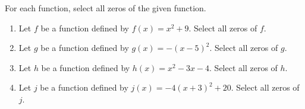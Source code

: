 \documentclass{ximera}
\author{Kenneth Berglund}
\begin{document}
\licenseSZ
\begin{exercise}
For each function, select all zeros of the given function. 

\begin{enumerate}
\item Let $f$ be a function defined by $f(x) = x^2 + 9$.
Select all zeros of $f$.
\begin{selectAll}
\end{selectAll}

\item Let $g$ be a function defined by $g(x) = -(x - 5)^2$.
Select all zeros of $g$.
\begin{selectAll}
\end{selectAll}

\item Let $h$ be a function defined by $h(x) = x^2 - 3x - 4$.
Select all zeros of $h$.
\begin{selectAll}
\end{selectAll}

\item Let $j$ be a function defined by $j(x) = -4(x + 3)^2 + 20$.
Select all zeros of $j$.
\begin{selectAll}
\end{selectAll}

\end{enumerate}

\end{exercise}
\end{document}
